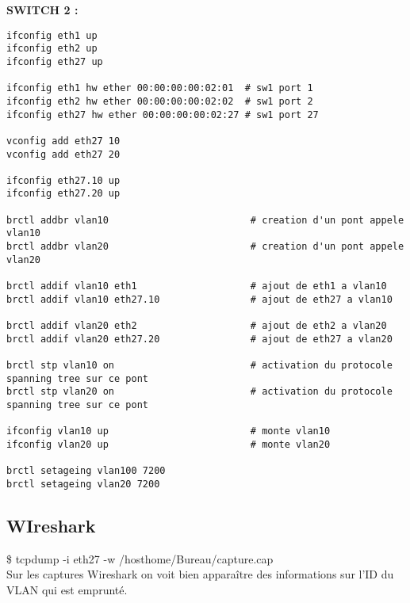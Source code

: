 \documentclass[a4paper]{article}
\begin{document}
\textbf{SWITCH 2 : }	
\begin{verbatim}
ifconfig eth1 up
ifconfig eth2 up
ifconfig eth27 up

ifconfig eth1 hw ether 00:00:00:00:02:01  # sw1 port 1
ifconfig eth2 hw ether 00:00:00:00:02:02  # sw1 port 2
ifconfig eth27 hw ether 00:00:00:00:02:27 # sw1 port 27

vconfig add eth27 10
vconfig add eth27 20

ifconfig eth27.10 up
ifconfig eth27.20 up

brctl addbr vlan10                         # creation d'un pont appele vlan10
brctl addbr vlan20                         # creation d'un pont appele vlan20

brctl addif vlan10 eth1                    # ajout de eth1 a vlan10
brctl addif vlan10 eth27.10                # ajout de eth27 a vlan10

brctl addif vlan20 eth2                    # ajout de eth2 a vlan20
brctl addif vlan20 eth27.20                # ajout de eth27 a vlan20

brctl stp vlan10 on                        # activation du protocole spanning tree sur ce pont
brctl stp vlan20 on                        # activation du protocole spanning tree sur ce pont

ifconfig vlan10 up                         # monte vlan10
ifconfig vlan20 up                         # monte vlan20

brctl setageing vlan100 7200
brctl setageing vlan20 7200
\end{verbatim}	

	\subsection{WIreshark}		
	
\$ tcpdump -i eth27 -w /hosthome/Bureau/capture.cap \\

Sur les captures Wireshark on voit bien apparaître des informations sur l'ID du VLAN qui est emprunté.
\end{document}
